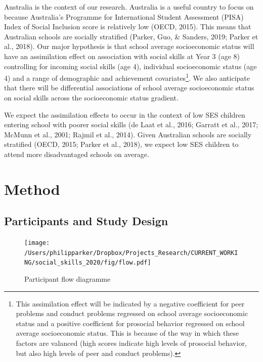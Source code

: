 \documentclass[
  english,
  man]{apa6}
\begin{document}
Australia is the context of our research. Australia is a useful country to focus on because Australia's Programme for International Student Assessment (PISA) Index of Social Inclusion score is relatively low (OECD, 2015). This means that Australian schools are socially stratified (Parker, Guo, \& Sanders, 2019; Parker et al., 2018). Our major hypothesis is that school average socioeconomic status will have an assimilation effect on association with social skills at Year 3 (age 8) controlling for incoming social skills (age 4), individual socioeconomic status (age 4) and a range of demographic and achievement covariates\footnote{This assimilation effect will be indicated by a negative coefficient for peer problems and conduct problems regressed on school average socioeconomic status and a positive coefficient for prosocial behavior regressed on school average socioeconomic status. This is because of the way in which these factors are valanced (high scores indicate high levels of prosocial behavior, but also high levels of peer and conduct problems).}. We also anticipate that there will be differential associations of school average socioeconomic status on social skills across the socioeconomic status gradient.

We expect the assimilation effects to occur in the context of low SES children entering school with poorer social skills (de Laat et al., 2016; Garratt et al., 2017; McMunn et al., 2001; Rajmil et al., 2014). Given Australian schools are socially stratified (OECD, 2015; Parker et al., 2018), we expect low SES children to attend more disadvantaged schools on average.

\hypertarget{method}{%
\section{Method}\label{method}}

\hypertarget{participants-and-study-design}{%
\subsection{Participants and Study Design}\label{participants-and-study-design}}

\begin{figure}
\centering
\texttt{[image: /Users/philipparker/Dropbox/Projects\_Research/CURRENT\_WORKING/social\_skills\_2020/fig/flow.pdf]}
\caption{\label{fig:consort}Participant flow diagramme}
\end{figure}
\end{document}
